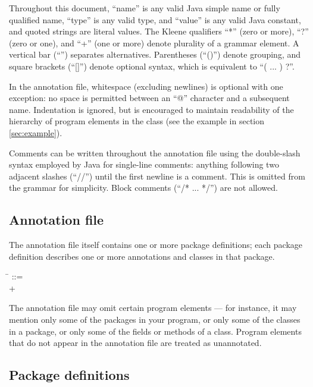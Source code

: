 \documentclass{article}
\begin{document}
Throughout this document, ``name'' is any valid Java simple name or 
fully qualified name, ``type'' is any valid type, and ``value'' is any
valid Java constant, and quoted strings are literal values.
%
The Kleene qualifiers ``*'' (zero or more), ``?'' (zero or one), and ``+''
(one or more) denote plurality of a grammar element.
%
A vertical bar (``\bnfor'') separates alternatives.
Parentheses (``()'') denote grouping, and square brackets (``[]'')
denote optional syntax, which is equivalent to ``( ... ) ?''.

In the annotation file, 
whitespace (excluding
newlines) is optional with one exception: no space is permitted
between an ``@'' character and a subsequent name. Indentation is
ignored, but is encouraged to maintain readability of the hierarchy of
program elements in the class (see the example in section
\ref{sec:example}).

Comments can be written throughout the annotation file using the double-slash
syntax employed by Java for single-line comments: anything following
two adjacent slashes (``//'') until the first newline is a comment.
This is omitted from the grammar for simplicity.
Block comments (``/* ... */'') are not allowed.




\subsection{Annotation file}

The annotation file itself contains one or more
package definitions; each package definition describes one or more
annotations and classes in that package.

\begin{tabbing}
\qquad \= \kill
{} ::= \\
\qquad    {}+
\end{tabbing}

The annotation file may omit certain program elements --- for instance, it
may mention only some of the packages in your program, or only some of the
classes in a package, or only some of the fields or methods of a class.
Program elements that do not appear in the annotation file are treated as
unannotated.


\subsection{Package definitions}
\label{sec:package-definition}
\end{document}
